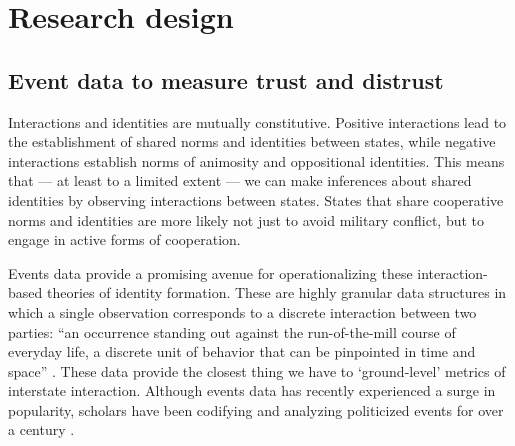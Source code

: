 \documentclass[10pt,]{article}
\let\stdsection\section
\renewcommand\section{\newpage\stdsection}
\begin{document}
\section{Research design}\label{research-design}

\subsection{Event data to measure trust and
distrust}\label{event-data-to-measure-trust-and-distrust}

Interactions and identities are mutually constitutive. Positive
interactions lead to the establishment of shared norms and identities
between states, while negative interactions establish norms of animosity
and oppositional identities. This means that --- at least to a limited
extent --- we can make inferences about shared identities by observing
interactions between states. States that share cooperative norms and
identities are more likely not just to avoid military conflict, but to
engage in active forms of cooperation.

Events data provide a promising avenue for operationalizing these
interaction-based theories of identity formation. These are highly
granular data structures in which a single observation corresponds to a
discrete interaction between two parties: ``an occurrence standing out
against the run-of-the-mill course of everyday life, a discrete unit of
behavior that can be pinpointed in time and space''
\citep[21]{Merritt1994}. These data provide the closest thing we have to
`ground-level' metrics of interstate interaction. Although events data
has recently experienced a surge in popularity, scholars have been
codifying and analyzing politicized events for over a century
\citetext{\citealp[19-20]{Merritt1994}; \citealp[548-550]{Schrodt2012}}.
\end{document}
